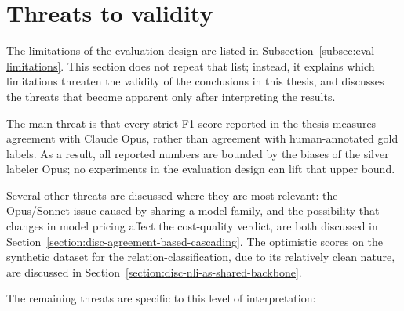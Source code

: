 \section{Threats to validity}\label{section:disc-threats-to-validity}

The limitations of the evaluation design are listed in Subsection~\ref{subsec:eval-limitations}. This section does not repeat that list; instead, it explains which limitations threaten the validity of the conclusions in this thesis, and discusses the threats that become apparent only after interpreting the results.

The main threat is that every strict-F1 score reported in the thesis measures agreement with Claude Opus, rather than agreement with human-annotated gold labels. As a result, all reported numbers are bounded by the biases of the silver labeler Opus; no experiments in the evaluation design can lift that upper bound.

Several other threats are discussed where they are most relevant: the Opus/Sonnet issue caused by sharing a model family, and the possibility that changes in model pricing affect the cost-quality verdict, are both discussed in Section~\ref{section:disc-agreement-based-cascading}. The optimistic scores on the synthetic dataset for the relation-classification, due to its relatively clean nature, are discussed in Section~\ref{section:disc-nli-as-shared-backbone}.

The remaining threats are specific to this level of interpretation:

